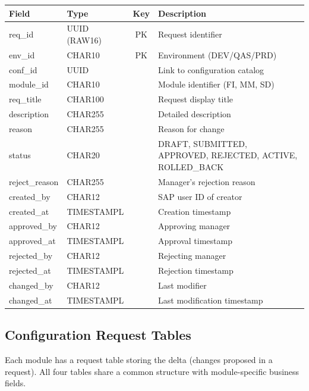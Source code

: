 \documentclass[12pt,a4paper]{report}
\begin{document}
\begin{longtable}{|l|l|c|p{6.5cm}|}
  \hline
  \rowcolor{tableheadpeach}
  \textbf{Field} & \textbf{Type} & \textbf{Key} & \textbf{Description} \\ \hline
  \endhead \hline \endfoot
  req\_id         & UUID (RAW16)  & PK & Request identifier \\ \hline
  env\_id         & CHAR10        & PK & Environment (DEV/QAS/PRD) \\ \hline
  conf\_id        & UUID          &    & Link to configuration catalog \\ \hline
  module\_id      & CHAR10        &    & Module identifier (FI, MM, SD) \\ \hline
  req\_title      & CHAR100       &    & Request display title \\ \hline
  description    & CHAR255       &    & Detailed description \\ \hline
  reason         & CHAR255       &    & Reason for change \\ \hline
  status         & CHAR20        &    & DRAFT, SUBMITTED, APPROVED, REJECTED, ACTIVE, ROLLED\_BACK \\ \hline
  reject\_reason  & CHAR255       &    & Manager's rejection reason \\ \hline
  created\_by     & CHAR12        &    & SAP user ID of creator \\ \hline
  created\_at     & TIMESTAMPL    &    & Creation timestamp \\ \hline
  approved\_by    & CHAR12        &    & Approving manager \\ \hline
  approved\_at    & TIMESTAMPL    &    & Approval timestamp \\ \hline
  rejected\_by    & CHAR12        &    & Rejecting manager \\ \hline
  rejected\_at    & TIMESTAMPL    &    & Rejection timestamp \\ \hline
  changed\_by     & CHAR12        &    & Last modifier \\ \hline
  changed\_at     & TIMESTAMPL    &    & Last modification timestamp \\ \hline
\end{longtable}

\subsection{Configuration Request Tables}

Each module has a request table storing the delta (changes proposed in a request). All four tables share a common structure with module-specific business fields.
\end{document}

